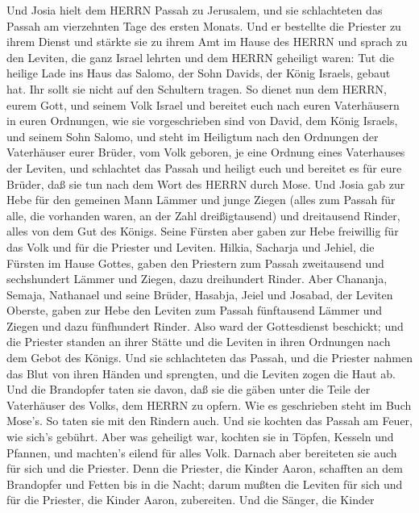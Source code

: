  Und Josia hielt dem HERRN Passah zu Jerusalem, und sie
schlachteten das Passah am vierzehnten Tage des ersten Monats.
 Und er bestellte die Priester zu ihrem Dienst und stärkte
sie zu ihrem Amt im Hause des HERRN  und sprach zu den
Leviten, die ganz Israel lehrten und dem HERRN geheiligt waren: Tut die
heilige Lade ins Haus das Salomo, der Sohn Davids, der König Israels,
gebaut hat. Ihr sollt sie nicht auf den Schultern tragen. So dienet nun
dem HERRN, eurem Gott, und seinem Volk Israel  und bereitet
euch nach euren Vaterhäusern in euren Ordnungen, wie sie vorgeschrieben
sind von David, dem König Israels, und seinem Sohn Salomo, 
und steht im Heiligtum nach den Ordnungen der Vaterhäuser eurer Brüder,
vom Volk geboren, je eine Ordnung eines Vaterhauses der Leviten,
 und schlachtet das Passah und heiligt euch und bereitet es
für eure Brüder, daß sie tun nach dem Wort des HERRN durch Mose.
 Und Josia gab zur Hebe für den gemeinen Mann Lämmer und
junge Ziegen (alles zum Passah für alle, die vorhanden waren, an der
Zahl dreißigtausend) und dreitausend Rinder, alles von dem Gut des
Königs.  Seine Fürsten aber gaben zur Hebe freiwillig für
das Volk und für die Priester und Leviten. Hilkia, Sacharja und Jehiel,
die Fürsten im Hause Gottes, gaben den Priestern zum Passah zweitausend
und sechshundert Lämmer und Ziegen, dazu dreihundert Rinder.
 Aber Chananja, Semaja, Nathanael und seine Brüder, Hasabja,
Jeiel und Josabad, der Leviten Oberste, gaben zur Hebe den Leviten zum
Passah fünftausend Lämmer und Ziegen und dazu fünfhundert Rinder.
 Also ward der Gottesdienst beschickt; und die Priester
standen an ihrer Stätte und die Leviten in ihren Ordnungen nach dem
Gebot des Königs.  Und sie schlachteten das Passah, und die
Priester nahmen das Blut von ihren Händen und sprengten, und die Leviten
zogen die Haut ab.  Und die Brandopfer taten sie davon, daß
sie die gäben unter die Teile der Vaterhäuser des Volks, dem HERRN zu
opfern. Wie es geschrieben steht im Buch Mose's. So taten sie mit den
Rindern auch.  Und sie kochten das Passah am Feuer, wie
sich's gebührt. Aber was geheiligt war, kochten sie in Töpfen, Kesseln
und Pfannen, und machten's eilend für alles Volk.  Darnach
aber bereiteten sie auch für sich und die Priester. Denn die Priester,
die Kinder Aaron, schafften an dem Brandopfer und Fetten bis in die
Nacht; darum mußten die Leviten für sich und für die Priester, die
Kinder Aaron, zubereiten.  Und die Sänger, die Kinder
